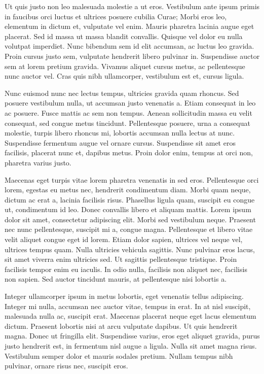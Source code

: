 \documentclass[extra,mreferee]{gji}
\begin{document}
Ut quis justo non leo malesuada molestie a ut eros. Vestibulum ante ipsum
primis in faucibus orci luctus et ultrices posuere cubilia Curae; Morbi eros
leo, elementum in dictum et, vulputate vel enim. Mauris pharetra lacinia augue
eget placerat. Sed id massa ut massa blandit convallis. Quisque vel dolor eu
nulla volutpat imperdiet. Nunc bibendum sem id elit accumsan, ac luctus leo
gravida. Proin cursus justo sem, vulputate hendrerit libero pulvinar in.
Suspendisse auctor sem at lorem pretium gravida. Vivamus aliquet cursus metus,
ac pellentesque nunc auctor vel. Cras quis nibh ullamcorper, vestibulum est et,
cursus ligula.

Nunc euismod nunc nec lectus tempus, ultricies gravida quam rhoncus. Sed
posuere vestibulum nulla, ut accumsan justo venenatis a. Etiam consequat in leo
ac posuere. Fusce mattis ac sem non tempus. Aenean sollicitudin massa eu velit
consequat, sed congue metus tincidunt. Pellentesque posuere, urna a consequat
molestie, turpis libero rhoncus mi, lobortis accumsan nulla lectus at nunc.
Suspendisse fermentum augue vel ornare cursus. Suspendisse sit amet eros
facilisis, placerat nunc et, dapibus metus. Proin dolor enim, tempus at orci
non, pharetra varius justo.

Maecenas eget turpis vitae lorem pharetra venenatis in sed eros. Pellentesque
orci lorem, egestas eu metus nec, hendrerit condimentum diam. Morbi quam neque,
dictum ac erat a, lacinia facilisis risus. Phasellus ligula quam, suscipit eu
congue ut, condimentum id leo. Donec convallis libero et aliquam mattis. Lorem
ipsum dolor sit amet, consectetur adipiscing elit. Morbi sed vestibulum neque.
Praesent nec nunc pellentesque, suscipit mi a, congue magna. Pellentesque et
libero vitae velit aliquet congue eget id lorem. Etiam dolor sapien, ultrices
vel neque vel, ultrices tempus quam. Nulla ultricies vehicula sagittis. Nunc
pulvinar eros lacus, sit amet viverra enim ultricies sed. Ut sagittis
pellentesque tristique. Proin facilisis tempor enim eu iaculis. In odio nulla,
facilisis non aliquet nec, facilisis non sapien. Sed auctor tincidunt mauris,
at pellentesque nisi lobortis a.

Integer ullamcorper ipsum in metus lobortis, eget venenatis tellus adipiscing.
Integer mi nulla, accumsan nec auctor vitae, tempus in erat. In at nisl
suscipit, malesuada nulla ac, suscipit erat. Maecenas placerat neque eget lacus
elementum dictum. Praesent lobortis nisi at arcu vulputate dapibus. Ut quis
hendrerit magna. Donec ut fringilla elit. Suspendisse varius, eros eget aliquet
gravida, purus justo hendrerit est, in fermentum nisl augue a ligula. Nulla sit
amet magna risus. Vestibulum semper dolor et mauris sodales pretium. Nullam
tempus nibh pulvinar, ornare risus nec, suscipit eros.
\end{document}
